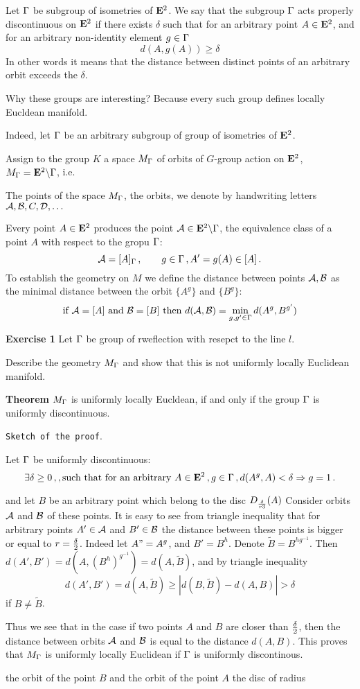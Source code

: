Let ${\Gamma}$ be subgroup of isometries of ${\bf E}^2$.
We say that the subgroup ${\Gamma}$ acts properly discontinuous
on ${\bf E}^2$ if there exists $\delta$ such that
for an arbitrary point $A\in {\bf E}^2$, and for an arbitrary
non-identity element $g\in {\Gamma}$ 
        $$
      d(A,g(A))\geq \delta
        $$
 In other words it means that the distance between 
distinct points of an arbitrary orbit exceeds the  $\delta$.

Why these groups are interesting?  Because every such group
defines locally Eucldean manifold. 

Indeed, let ${\Gamma}$ be an arbitrary subgroup
of group of isometries of ${\bf E}^2$.


Assign to the group $K$ a
space $M_{\Gamma}$ of orbits of $G$-group action
on ${\bf E}^2$,
$M_{\Gamma}={\bf E}^2\backslash {\Gamma}$, i.e. 
           
The points of the space $M_{\Gamma}$, the orbits, 
 we denote by handwriting letters ${\cal A},{\cal B},C,{\cal D},\dots$

Every  point $A\in {\bf E}^2$ produces the point
${\cal A}\in {\bf E}^2\backslash {\Gamma}$, the equivalence class
of a point $A$ with respect to the gropu ${\Gamma}$:
         $$
{\cal A}=[A]_{\Gamma}\,,\qquad  g\in {\Gamma}\,,
A'=g(A)\in [A]\,. 
        $$
To establish the geometry on $M$
we define the distance between points ${\cal A},{\cal B}$
as the minimal distance between the orbit
   $\{A^g\}$ and $\{B^g\}$:
            $$
\hbox{if ${\cal A}=[A]$ and ${\cal B}=[B]$ then}\,\,
d({\cal A},{\cal B})=\min_{g,g'\in{\Gamma}}d(A^g,B^{g'})
            $$ 

{\bf Exercise 1}  Let ${\Gamma}$ be group of rweflection
with resepct to the line $l$.

  Describe the geometry $M_{\Gamma}$
and show that this is not uniformly locally Euclidean manifold.

\medskip

{\bf Theorem}  $M_{\Gamma}$ is uniformly locally Eucldean, 
if and only if the group ${\Gamma}$ is uniformly discontinuous.  

 {\tt Sketch of the proof}.

Let ${\Gamma}$ be uniformly discontinuous:
         $$
\exists\delta\geq 0 \,,,
\hbox{such that for an arbitrary}\,\,
 A\in {\bf E}^2\,, g\in {\Gamma}\,, d(A^g,A)<\delta \Rightarrow
   g=1\,.    
        $$

and let $B$ be an arbitrary point  
which belong to the disc $D_{\delta\over r3}(A)$
Consider orbits ${\cal A}$ and ${\cal B}$ of these points.
It is easy to see from triangle inequality that
for arbitrary points $A'\in{\cal A}$ and $B'\in {\cal B}$
the distance between these points is bigger or equal to
  $r={\delta\over 2}$. Indeed let $A"=A^g$, and 
$B'=B^h$. Denote $\tilde B=B^{hg^{-1}}$. Then
$d(A',B')=
d\left(A, \left(B^h\right)^{g^{-1}}\right)=
d\left(A, \tilde B\right)$, and by triangle inequality
     $$
d(A',B')=d(A,\tilde B)\geq \left|d(B,\tilde B)-d(A,B)\right|
>\delta
     $$
if $B\not=\tilde B$.


Thus we see that in the case if two points $A$
and $B$ are closer than $\delta\over 2$,
then the distance between orbits ${\cal A}$ and ${\cal B}$
is equal to the distance $d(A,B)$.
This proves that $M_{\Gamma}$ is uniformly locally Euclidean
if ${\Gamma}$ is uniformly discontinous.



the orbit of the point $B$ and the orbit of the point $A$
the  disc of radius
\bye
